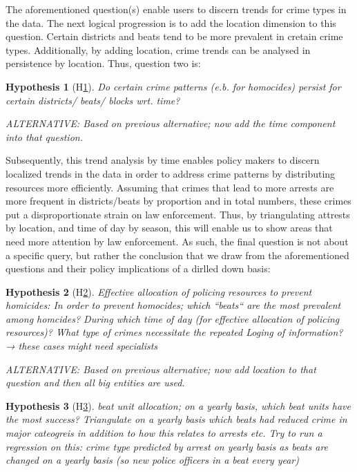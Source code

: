 \documentclass[a4paper]{article}
\newtheorem{hyp}{Hypothesis}
\begin{document}
The aforementioned question(s) enable users to discern trends for crime types in the data. The next logical progression is to add the location dimension to this question. Certain districts and beats tend to be more prevalent in cretain crime types. Additionally, by adding location, crime trends can be analysed in persistence by location. Thus, question two is:

\begin{hyp}[H\ref{hyp:second}] \label{hyp:second}
Do certain crime patterns (e.b. for homocides) persist for certain districts/ beats/ blocks wrt. time?

ALTERNATIVE: Based on previous alternative; now add the time component into that question.
\end{hyp}

Subsequently, this trend analysis by time enables policy makers to discern localized trends in the data in order to address crime patterns by distributing resources more efficiently. Assuming that crimes that lead to more arrests are more frequent in districts/beats by proportion and in total numbers, these crimes put a disproportionate strain on law enforcement. Thus, by triangulating attrests by location, and time of day by season, this will enable us to show areas that need more attention by law enforcement. As such, the final question is not about a specific query, but rather the conclusion that we draw from the aforementioned questions and their policy implications of a dirlled down basis:


\begin{hyp}[H\ref{hyp:third}] \label{hyp:third}
Effective allocation of policing resources to prevent homicides:
In order to prevent homocides; which “beats“ are the most prevalent among homcides? During which time of day (for effective allocation of policing resources)? 
 What type of crimes necessitate the repeated Loging of information? → these cases might need specialists
 
ALTERNATIVE: Based on previous alternative; now add location to that question and then all big entities are used. 
 
\end{hyp}

\begin{hyp}[H\ref{hyp:fourth}] \label{hyp:fourth}
beat unit allocation; on a yearly basis, which beat units have the most success? Triangulate on a yearly basis which beats had reduced crime in major cateogreis in addition to how this relates to arrests etc. Try to run a regression on this: crime type predicted by arrest on yearly basis as beats are changed on a yearly basis (so new police officers in a beat every year)
\end{hyp}
\end{document}
